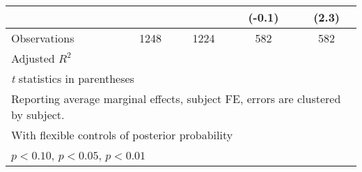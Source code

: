 \begin{table}[htbp]
\begin{tabular}{l*{4}{c}}
                &                  &                  &   (-0.1)         &    (2.3)         \\
\hline
Observations    &     1248         &     1224         &      582         &      582         \\
Adjusted \(R^{2}\)&                  &                  &                  &                  \\
\hline\hline
\multicolumn{5}{l}{\footnotesize \textit{t} statistics in parentheses}\\
\multicolumn{5}{l}{\footnotesize Reporting average marginal effects, subject FE, errors are clustered by subject.}\\
\multicolumn{5}{l}{\footnotesize With flexible controls of posterior probability}\\
\multicolumn{5}{l}{\footnotesize \sym{*} \(p<0.10\), \sym{**} \(p<0.05\), \sym{***} \(p<0.01\)}\\
\end{tabular}
\end{table}

